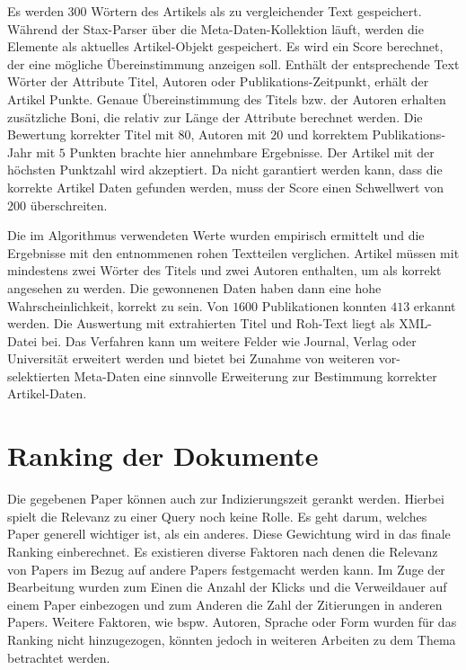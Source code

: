 Es werden $300$ Wörtern des Artikels als zu
vergleichender Text gespeichert. Während der Stax-Parser über die
Meta-Daten-Kollektion läuft, werden die Elemente als aktuelles
Artikel-Objekt gespeichert. Es wird ein Score berechnet, der eine
mögliche Übereinstimmung anzeigen soll. Enthält der entsprechende Text
Wörter der Attribute Titel, Autoren oder Publikations-Zeitpunkt,
erhält der Artikel Punkte. Genaue Übereinstimmung des Titels bzw. der
Autoren erhalten zusätzliche Boni, die relativ zur Länge der Attribute
berechnet werden. Die Bewertung korrekter Titel mit $80$, Autoren mit $20$
und korrektem Publikations-Jahr mit $5$ Punkten brachte hier annehmbare
Ergebnisse. Der Artikel mit der höchsten Punktzahl wird akzeptiert. Da
nicht garantiert werden kann, dass die korrekte Artikel Daten gefunden
werden, muss der Score einen Schwellwert von $200$ überschreiten.

Die im Algorithmus verwendeten Werte wurden empirisch ermittelt und die Ergebnisse mit
den entnommenen rohen Textteilen verglichen. Artikel
müssen mit mindestens zwei Wörter des Titels und zwei Autoren
enthalten, um als korrekt angesehen zu werden. Die gewonnenen Daten
haben dann eine hohe Wahrscheinlichkeit, korrekt zu sein. Von $1600$
Publikationen konnten $413$ erkannt werden. Die Auswertung mit
extrahierten Titel und Roh-Text liegt als XML-Datei bei. Das
Verfahren kann um weitere Felder wie Journal, Verlag oder Universität
erweitert werden und bietet bei Zunahme von weiteren vor-selektierten
Meta-Daten eine sinnvolle Erweiterung zur Bestimmung korrekter Artikel-Daten.

\section{Ranking der Dokumente}\label{sec:ranking}


Die gegebenen Paper können auch zur Indizierungszeit gerankt
werden. Hierbei spielt die Relevanz zu einer Query noch keine
Rolle. Es geht darum, welches Paper generell wichtiger ist, als ein
anderes. Diese Gewichtung wird in das finale Ranking einberechnet. Es
existieren diverse Faktoren nach denen die Relevanz von Papers im
Bezug auf andere Papers festgemacht werden kann. Im Zuge der
Bearbeitung wurden zum Einen die Anzahl der Klicks und die
Verweildauer auf einem Paper einbezogen und zum Anderen die Zahl der
Zitierungen in anderen Papers. Weitere Faktoren, wie bspw. Autoren,
Sprache oder Form wurden für das Ranking nicht hinzugezogen, könnten
jedoch in weiteren Arbeiten zu dem Thema betrachtet werden.  \\

